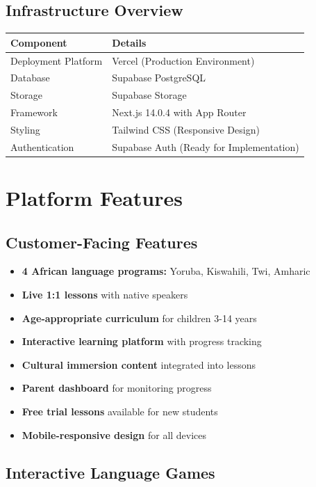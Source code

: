 \documentclass[11pt,a4paper]{article}
\newcommand{\mycheck}{\textcolor{ispeak-green}{\textbf{$\checkmark$}}}
\begin{document}
\subsection{Infrastructure Overview}
\begin{tabular}{ll}
\toprule
\textbf{Component} & \textbf{Details} \\
\midrule
Deployment Platform & Vercel (Production Environment) \\
Database & Supabase PostgreSQL \\
Storage & Supabase Storage \\
Framework & Next.js 14.0.4 with App Router \\
Styling & Tailwind CSS (Responsive Design) \\
Authentication & Supabase Auth (Ready for Implementation) \\
\bottomrule
\end{tabular}

\section{Platform Features}

\subsection{Customer-Facing Features}

\begin{itemize}[leftmargin=*, label=\mycheck]
    \item \textbf{4 African language programs:} Yoruba, Kiswahili, Twi, Amharic
    \item \textbf{Live 1:1 lessons} with native speakers
    \item \textbf{Age-appropriate curriculum} for children 3-14 years
    \item \textbf{Interactive learning platform} with progress tracking
    \item \textbf{Cultural immersion content} integrated into lessons
    \item \textbf{Parent dashboard} for monitoring progress
    \item \textbf{Free trial lessons} available for new students
    \item \textbf{Mobile-responsive design} for all devices
\end{itemize}

\subsection{Interactive Language Games}
\end{document}
